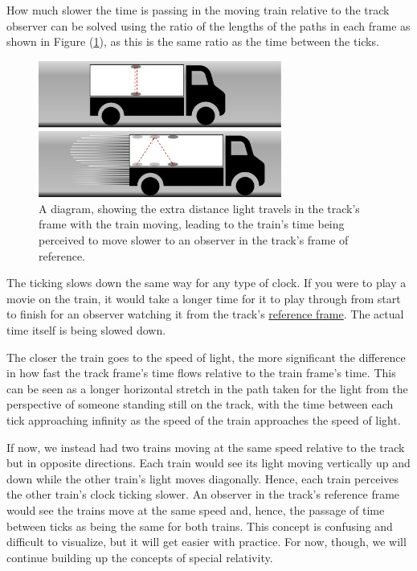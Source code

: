 How much slower the time is passing in the moving train relative to the track observer can be solved using the ratio of the lengths of the paths in each frame as shown in Figure (\ref{fig: train clock}), as this is the same ratio as the time between the ticks.

\begin{figure}[H]
	\centering
	\includegraphics[width=8cm]{images/pdf/lorry_clock.pdf}
	\caption{A diagram, showing the extra distance light travels in the track's frame with the train moving, leading to the train's time being perceived to move slower to an observer in the track's frame of reference.}
	\label{fig: train clock}
\end{figure}

The ticking slows down the same way for any type of clock.
If you were to play a movie on the train, it would take a longer time for it to play through from start to finish for an observer watching it from the track's \hyperlink{def-Reference-frame}{reference frame}.
The actual time itself is being slowed down.

The closer the train goes to the speed of light, the more significant the difference in how fast the track frame's time flows relative to the train frame's time.
This can be seen as a longer horizontal stretch in the path taken for the light from the perspective of someone standing still on the track, with the time between each tick approaching infinity as the speed of the train approaches the speed of light.

If now, we instead had two trains moving at the same speed relative to the track but in opposite directions.
Each train would see its light moving vertically up and down while the other train's light moves diagonally.
Hence, each train perceives the other train's clock ticking slower.
An observer in the track's reference frame would see the trains move at the same speed and, hence, the passage of time between ticks as being the same for both trains.
This concept is confusing and difficult to visualize, but it will get easier with practice.
For now, though, we will continue building up the concepts of special relativity.

